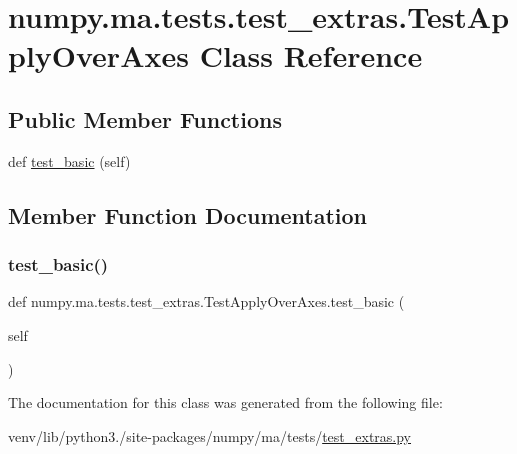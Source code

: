\hypertarget{classnumpy_1_1ma_1_1tests_1_1test__extras_1_1TestApplyOverAxes}{}\section{numpy.\+ma.\+tests.\+test\+\_\+extras.\+Test\+Apply\+Over\+Axes Class Reference}
\label{classnumpy_1_1ma_1_1tests_1_1test__extras_1_1TestApplyOverAxes}
\subsection*{Public Member Functions}
\begin{DoxyCompactItemize}
\item 
def \hyperlink{classnumpy_1_1ma_1_1tests_1_1test__extras_1_1TestApplyOverAxes_a1d7debc7ea0d28d3d3697d5cbe239d3f}{test\+\_\+basic} (self)
\end{DoxyCompactItemize}


\subsection{Member Function Documentation}
\mbox{\label{classnumpy_1_1ma_1_1tests_1_1test__extras_1_1TestApplyOverAxes_a1d7debc7ea0d28d3d3697d5cbe239d3f}} 
\subsubsection{\texorpdfstring{test\+\_\+basic()}{test\_basic()}}
{\footnotesize\ttfamily def numpy.\+ma.\+tests.\+test\+\_\+extras.\+Test\+Apply\+Over\+Axes.\+test\+\_\+basic (\begin{DoxyParamCaption}\item[{}]{self }\end{DoxyParamCaption})}



The documentation for this class was generated from the following file\+:\begin{DoxyCompactItemize}
\item 
venv/lib/python3./site-\/packages/numpy/ma/tests/\hyperlink{test__extras_8py}{test\+\_\+extras.\+py}\end{DoxyCompactItemize}
